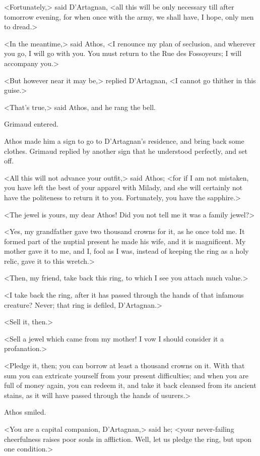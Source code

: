 <Fortunately,> said D'Artagnan, <all this will be only necessary till after tomorrow evening, for when once with the army, we shall have, I hope, only men to dread.> 

<In the meantime,> said Athos, <I renounce my plan of seclusion, and wherever you go, I will go with you. You must return to the Rue des Fossoyeurs; I will accompany you.> 

<But however near it may be,> replied D'Artagnan, <I cannot go thither in this guise.> 

<That's true,> said Athos, and he rang the bell. 

Grimaud entered. 

Athos made him a sign to go to D'Artagnan's residence, and bring back some clothes. Grimaud replied by another sign that he understood perfectly, and set off. 

<All this will not advance your outfit,> said Athos; <for if I am not mistaken, you have left the best of your apparel with Milady, and she will certainly not have the politeness to return it to you. Fortunately, you have the sapphire.> 

<The jewel is yours, my dear Athos! Did you not tell me it was a family jewel?> 

<Yes, my grandfather gave two thousand crowns for it, as he once told me. It formed part of the nuptial present he made his wife, and it is magnificent. My mother gave it to me, and I, fool as I was, instead of keeping the ring as a holy relic, gave it to this wretch.> 

<Then, my friend, take back this ring, to which I see you attach much value.> 

<I take back the ring, after it has passed through the hands of that infamous creature? Never; that ring is defiled, D'Artagnan.> 

<Sell it, then.> 

<Sell a jewel which came from my mother! I vow I should consider it a profanation.> 

<Pledge it, then; you can borrow at least a thousand crowns on it. With that sum you can extricate yourself from your present difficulties; and when you are full of money again, you can redeem it, and take it back cleansed from its ancient stains, as it will have passed through the hands of usurers.> 

Athos smiled. 

<You are a capital companion, D'Artagnan,> said he; <your never-failing cheerfulness raises poor souls in affliction. Well, let us pledge the ring, but upon one condition.> 

